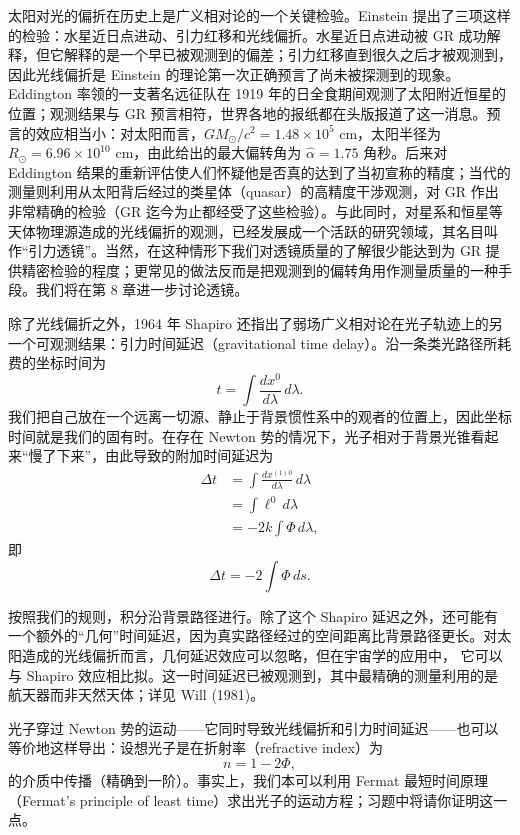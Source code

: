 太阳对光的偏折在历史上是广义相对论的一个关键检验。Einstein 提出了三项这样的检验：水星近日点进动、引力红移和光线偏折。水星近日点进动被 GR 成功解释，但它解释的是一个早已被观测到的偏差；引力红移直到很久之后才被观测到，
因此光线偏折是 Einstein 的理论第一次正确预言了尚未被探测到的现象。Eddington 率领的一支著名远征队在 1919 年的日全食期间观测了太阳附近恒星的位置；观测结果与 GR 预言相符，世界各地的报纸都在头版报道了这一消息。预言的效应相当小：对太阳而言，$GM_\odot/c^2 = 1.48\times10^5$ cm，太阳半径为 $R_\odot = 6.96\times10^{10}$ cm，由此给出的最大偏转角为 $\widehat{\alpha} = 1.75$ 角秒。后来对 Eddington 结果的重新评估使人们怀疑他是否真的达到了当初宣称的精度；当代的测量则利用从太阳背后经过的类星体（quasar）的高精度干涉观测，对 GR 作出非常精确的检验（GR 迄今为止都经受了这些检验）。与此同时，对星系和恒星等天体物理源造成的光线偏折的观测，已经发展成一个活跃的研究领域，其名目叫作“引力透镜”。当然，在这种情形下我们对透镜质量的了解很少能达到为 GR 提供精密检验的程度；更常见的做法反而是把观测到的偏转角用作测量质量的一种手段。我们将在第 8 章进一步讨论透镜。

除了光线偏折之外，1964 年 Shapiro 还指出了弱场广义相对论在光子轨迹上的另一个可观测结果：引力时间延迟（gravitational time delay）。沿一条类光路径所耗费的坐标时间为
\begin{equation*}
t = \int\frac{dx^0}{d\lambda}\, d\lambda.
\tag{7.82}
\end{equation*}
我们把自己放在一个远离一切源、静止于背景惯性系中的观者的位置上，因此坐标时间就是我们的固有时。在存在 Newton 势的情况下，光子相对于背景光锥看起来“慢了下来”，由此导致的附加时间延迟为
\begin{align*}
\Delta t &= \int\frac{dx^{(1)0}}{d\lambda}\, d\lambda \\
&= \int \ell^0\, d\lambda \\
&= -2k\int \Phi\, d\lambda,
\tag{7.83}
\end{align*}
即
\begin{equation*}
\Delta t = -2\int \Phi\, ds.
\tag{7.84}
\end{equation*}

按照我们的规则，积分沿背景路径进行。除了这个 Shapiro 延迟之外，还可能有一个额外的“几何”时间延迟，因为真实路径经过的空间距离比背景路径更长。对太阳造成的光线偏折而言，几何延迟效应可以忽略，但在宇宙学的应用中，
它可以与 Shapiro 效应相比拟。这一时间延迟已被观测到，其中最精确的测量利用的是航天器而非天然天体；详见 Will (1981)。

光子穿过 Newton 势的运动——它同时导致光线偏折和引力时间延迟——也可以等价地这样导出：设想光子是在折射率（refractive index）为
\begin{equation*}
n = 1 - 2\Phi,
\tag{7.85}
\end{equation*}
的介质中传播（精确到一阶）。事实上，我们本可以利用 Fermat 最短时间原理（Fermat's principle of least time）求出光子的运动方程；习题中将请你证明这一点。

